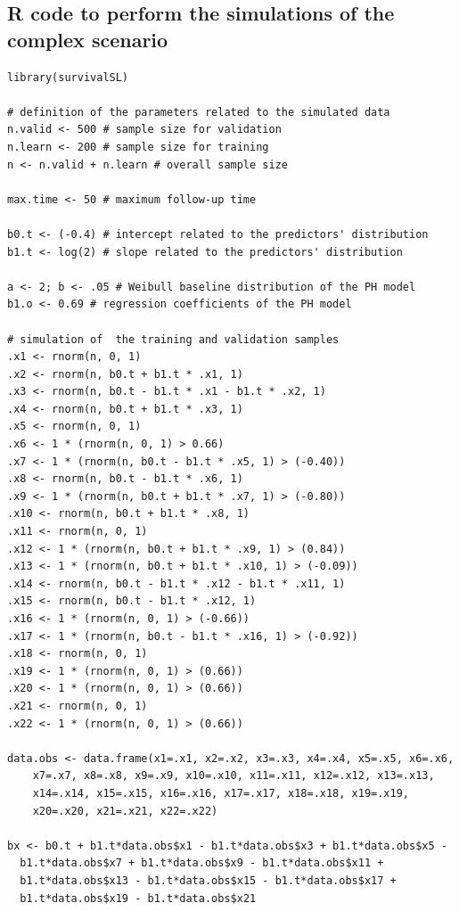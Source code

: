 \newpage

\hypertarget{r-code-to-perform-the-simulations-of-the-complex-scenario}{%
\subsection{R code to perform the simulations of the complex scenario}\label{r-code-to-perform-the-simulations-of-the-complex-scenario}}

\begin{verbatim}
library(survivalSL)

# definition of the parameters related to the simulated data
n.valid <- 500 # sample size for validation
n.learn <- 200 # sample size for training
n <- n.valid + n.learn # overall sample size

max.time <- 50 # maximum follow-up time

b0.t <- (-0.4) # intercept related to the predictors' distribution
b1.t <- log(2) # slope related to the predictors' distribution

a <- 2; b <- .05 # Weibull baseline distribution of the PH model
b1.o <- 0.69 # regression coefficients of the PH model

# simulation of  the training and validation samples
.x1 <- rnorm(n, 0, 1)
.x2 <- rnorm(n, b0.t + b1.t * .x1, 1)
.x3 <- rnorm(n, b0.t - b1.t * .x1 - b1.t * .x2, 1)
.x4 <- rnorm(n, b0.t + b1.t * .x3, 1)
.x5 <- rnorm(n, 0, 1)
.x6 <- 1 * (rnorm(n, 0, 1) > 0.66)
.x7 <- 1 * (rnorm(n, b0.t - b1.t * .x5, 1) > (-0.40))
.x8 <- rnorm(n, b0.t - b1.t * .x6, 1)
.x9 <- 1 * (rnorm(n, b0.t + b1.t * .x7, 1) > (-0.80))
.x10 <- rnorm(n, b0.t + b1.t * .x8, 1)
.x11 <- rnorm(n, 0, 1)
.x12 <- 1 * (rnorm(n, b0.t + b1.t * .x9, 1) > (0.84))
.x13 <- 1 * (rnorm(n, b0.t + b1.t * .x10, 1) > (-0.09))
.x14 <- rnorm(n, b0.t - b1.t * .x12 - b1.t * .x11, 1)
.x15 <- rnorm(n, b0.t - b1.t * .x12, 1)
.x16 <- 1 * (rnorm(n, 0, 1) > (-0.66))
.x17 <- 1 * (rnorm(n, b0.t - b1.t * .x16, 1) > (-0.92))
.x18 <- rnorm(n, 0, 1)
.x19 <- 1 * (rnorm(n, 0, 1) > (0.66))
.x20 <- 1 * (rnorm(n, 0, 1) > (0.66))
.x21 <- rnorm(n, 0, 1)
.x22 <- 1 * (rnorm(n, 0, 1) > (0.66))

data.obs <- data.frame(x1=.x1, x2=.x2, x3=.x3, x4=.x4, x5=.x5, x6=.x6,
    x7=.x7, x8=.x8, x9=.x9, x10=.x10, x11=.x11, x12=.x12, x13=.x13,
    x14=.x14, x15=.x15, x16=.x16, x17=.x17, x18=.x18, x19=.x19,
    x20=.x20, x21=.x21, x22=.x22)

bx <- b0.t + b1.t*data.obs$x1 - b1.t*data.obs$x3 + b1.t*data.obs$x5 -
  b1.t*data.obs$x7 + b1.t*data.obs$x9 - b1.t*data.obs$x11 +
  b1.t*data.obs$x13 - b1.t*data.obs$x15 - b1.t*data.obs$x17 +
  b1.t*data.obs$x19 - b1.t*data.obs$x21


\end{verbatim}
